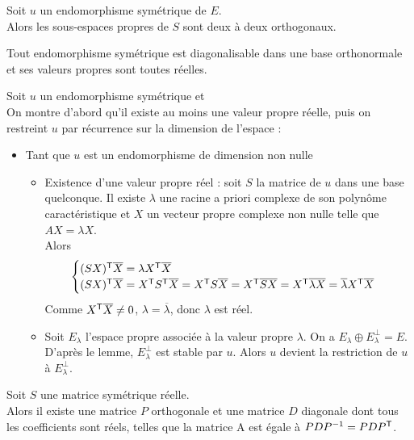 \documentclass{book}
\begin{document}
\begin{Lemme}
Soit $u$ un endomorphisme symétrique de $E$.\\
Alors les sous-espaces propres de $S$ sont deux à deux orthogonaux.
\end{Lemme}

\begin{Theoreme}
Tout endomorphisme symétrique est diagonalisable dans une base orthonormale et ses valeurs propres sont toutes réelles.
\end{Theoreme}
\begin{Demonstration}
Soit $u$ un endomorphisme symétrique et \\
On montre d'abord qu'il  existe au moins une valeur propre réelle, puis on restreint $u$ par récurrence sur la dimension de l'espace :
\begin{itemize}
\item Tant que $u$ est un endomorphisme  de dimension non nulle 
\begin{itemize}
\item Existence d'une valeur propre réel : soit $S$ la matrice de $u$ dans une base quelconque. Il existe $\lambda$ une racine a priori complexe de son polynôme caractéristique et $X$ un vecteur propre complexe non nulle telle que $AX=\lambda X$.\\
Alors
$$ \begin{cases} (SX)^{\mathsf {T}}\overline{X}=\lambda X^{\mathsf {T}}\overline{X}\\
(SX)^{\mathsf {T}}\overline{X}=X^{\mathsf {T}}S^{\mathsf {T}}\overline{X}=X^{\mathsf {T}}S\overline{X}=X^{\mathsf {T}}\overline{SX}=X^{\mathsf {T}}\overline{\lambda X}=\overline{\lambda}X^{\mathsf {T}}\overline{X} \\
\end{cases} $$
Comme  $X^{\mathsf {T}}\overline{X}\neq 0$, $\lambda=\overline{\lambda}$, donc $\lambda$ est réel.
\item Soit $E_\lambda$ l'espace propre associée à la valeur propre $\lambda$. On a $E_\lambda\oplus E^{\perp}_\lambda=E$. D'après le lemme,   $E^{\perp}_\lambda$ est stable par $u$. Alors $u$ devient la restriction de $u$ à $E^{\perp}_\lambda$.
\end{itemize}
\end{itemize}


\end{Demonstration}
\begin{Theoreme}
Soit $S$ une matrice symétrique réelle.\\
Alors il existe une matrice $P$ orthogonale  et une matrice $D$ diagonale dont tous les coefficients sont réels, telles que la matrice A est égale à $PDP^{-1}=PDP^{\mathsf {T}}$.
\end{Theoreme}
\end{document}
